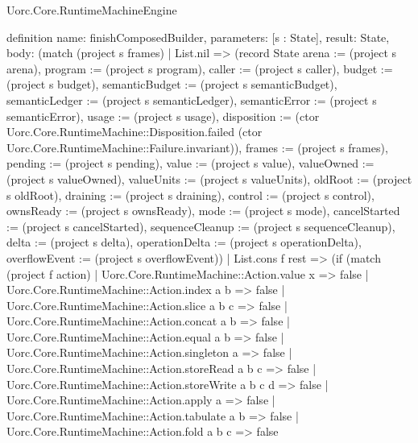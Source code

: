 \begin{lexlean}{Uorc.Core.RuntimeMachineEngine}
\begin{semanticmodule}
definition{
  name: finishComposedBuilder,
  parameters: [s : State],
  result: State,
  body: (match (project s frames)
    | List.nil => (record State {arena := (project s arena), program := (project s program), caller := (project s caller), budget := (project s budget), semanticBudget := (project s semanticBudget), semanticLedger := (project s semanticLedger), semanticError := (project s semanticError), usage := (project s usage), disposition := (ctor Uorc.Core.RuntimeMachine::Disposition.failed (ctor Uorc.Core.RuntimeMachine::Failure.invariant)), frames := (project s frames), pending := (project s pending), value := (project s value), valueOwned := (project s valueOwned), valueUnits := (project s valueUnits), oldRoot := (project s oldRoot), draining := (project s draining), control := (project s control), ownsReady := (project s ownsReady), mode := (project s mode), cancelStarted := (project s cancelStarted), sequenceCleanup := (project s sequenceCleanup), delta := (project s delta), operationDelta := (project s operationDelta), overflowEvent := (project s overflowEvent)})
    | List.cons f rest => (if (match (project f action)
      | Uorc.Core.RuntimeMachine::Action.value x => false
      | Uorc.Core.RuntimeMachine::Action.index a b => false
      | Uorc.Core.RuntimeMachine::Action.slice a b c => false
      | Uorc.Core.RuntimeMachine::Action.concat a b => false
      | Uorc.Core.RuntimeMachine::Action.equal a b => false
      | Uorc.Core.RuntimeMachine::Action.singleton a => false
      | Uorc.Core.RuntimeMachine::Action.storeRead a b c => false
      | Uorc.Core.RuntimeMachine::Action.storeWrite a b c d => false
      | Uorc.Core.RuntimeMachine::Action.apply a => false
      | Uorc.Core.RuntimeMachine::Action.tabulate a b => false
      | Uorc.Core.RuntimeMachine::Action.fold a b c => false
}
\end{semanticmodule}
\end{lexlean}
